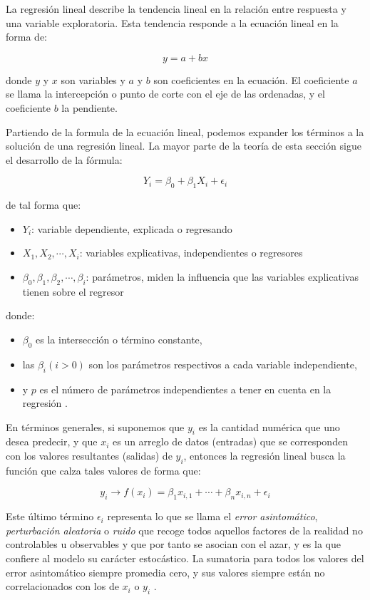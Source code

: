 \documentclass[letterpaper, spanish, 11pt]{report}
\begin{document}
La regresión lineal describe la tendencia lineal en la relación entre respuesta y una variable exploratoria. Esta tendencia responde a la ecuación lineal en la forma de:

\[ y = a + bx\]

donde \(y\) y \(x\) son variables y \(a\) y \(b\) son coeficientes en la ecuación. El coeficiente \(a\) se llama la intercepción o punto de corte con el eje de las ordenadas, y el coeficiente \(b\) la pendiente. 

Partiendo de la formula de la ecuación lineal, podemos expander los términos a la solución de una regresión lineal. La mayor parte de la teoría de esta sección sigue el desarrollo de la fórmula:

\[Y_{i} = \beta_{0} + \beta_{1}X_{i} + \epsilon_{i}\]

\noindent de tal forma que:

\begin{itemize}
	\item[] \(Y_{i}\): variable dependiente, explicada o regresando
	\item[] \(X_{1},X_{2},\cdots ,X_{i}\): variables explicativas, independientes o regresores
	\item[] \(\beta_{0},\beta_{1},\beta_{2},\cdots ,\beta_{i}\): parámetros, miden la influencia que las variables explicativas tienen sobre el regresor
\end{itemize}

\noindent donde:

\begin{itemize}
	\item[] \(\beta_0\) es la intersección o término constante, 
	\item[] las \(\beta _{i} (i>0)\) son los parámetros respectivos a cada variable independiente,
	\item[] y \(p\) es el número de parámetros independientes a tener en cuenta en la regresión \cite{yakir}.    
\end{itemize}

En términos generales, si suponemos que $y_{i}$ es la cantidad numérica que uno desea predecir, y que $x_{i}$ es un arreglo de datos (entradas) que se corresponden con los valores resultantes (salidas) de $y_{i}$, entonces la regresión lineal busca la función que calza tales valores de forma que:

\[ y_{i} \rightarrow f(x_{i}) = \beta_{1}x_{i, 1} + \cdots + \beta_{n}x_{i, n} + \epsilon_{i} \]

Este último término $\epsilon_{i}$ representa lo que se llama el \emph{error asintomático}, \emph{perturbación aleatoria} o \emph{ruido} que recoge todos aquellos factores de la realidad no controlables u observables y que por tanto se asocian con el azar, y es la que confiere al modelo su carácter estocástico. La sumatoria para todos los valores del error asintomático siempre promedia cero, y sus valores siempre están no correlacionados con los de $x_{i}$ o $y_{i}$ \cite{zumelMount}. 
\end{document}
